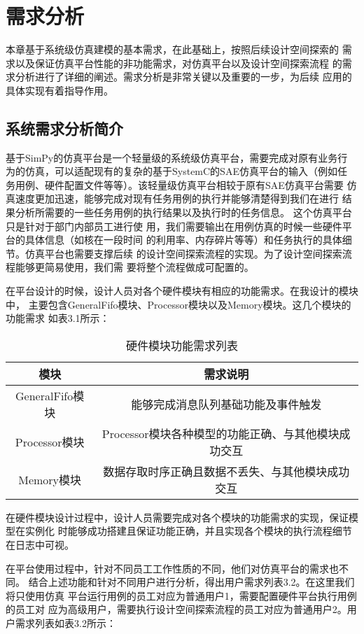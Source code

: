 
\chapter{需求分析}
本章基于系统级仿真建模的基本需求，在此基础上，按照后续设计空间探索的
需求以及保证仿真平台性能的非功能需求，对仿真平台以及设计空间探索流程
的需求分析进行了详细的阐述。需求分析是非常关键以及重要的一步，为后续
应用的具体实现有着指导作用。

\section{系统需求分析简介}
基于SimPy的仿真平台是一个轻量级的系统级仿真平台，需要完成对原有业务行
为的仿真，可以适配现有的复杂的基于SystemC的SAE仿真平台的输入（例如任
务用例、硬件配置文件等等）。该轻量级仿真平台相较于原有SAE仿真平台需要
仿真速度更加迅速，能够完成对现有任务用例的执行并能够清楚得到我们在进行
结果分析所需要的一些任务用例的执行结果以及执行时的任务信息。
这个仿真平台只是针对于部门内部员工进行使
用，我们需要输出在用例仿真的时候一些硬件平台的具体信息（如核在一段时间
的利用率、内存碎片等等）和任务执行的具体细节。仿真平台也需要支撑后续
的设计空间探索流程的实现。为了设计空间探索流程能够更简易使用，我们需
要将整个流程做成可配置的。

在平台设计的时候，设计人员对各个硬件模块有相应的功能需求。在我设计的模块中，
主要包含GeneralFifo模块、Processor模块以及Memory模块。这几个模块的功能需求
如表3.1所示：
\begin{table}[]
    \centering\normalsize
    \caption{硬件模块功能需求列表}
    \begin{tabular}{|c|c|}
    \hline
    模块            & 需求说明                           \\ \hline
    GeneralFifo模块 & 能够完成消息队列基础功能及事件触发              \\ \hline
    Processor模块   & Processor模块各种模型的功能正确、与其他模块成功交互 \\ \hline
    Memory模块      & 数据存取时序正确且数据不丢失、与其他模块成功交互       \\ \hline
    \end{tabular}
    \end{table}

在硬件模块设计过程中，设计人员需要完成对各个模块的功能需求的实现，保证模型在实例化
时能够成功搭建且保证功能正确，并且实现各个模块的执行流程细节在日志中可视。

在平台使用过程中，针对不同员工工作性质的不同，他们对仿真平台的需求也不同。
结合上述功能和针对不同用户进行分析，得出用户需求列表3.2。在这里我们将只使用仿真
平台运行用例的员工对应为普通用户1，需要配置硬件平台执行用例的员工对
应为高级用户，需要执行设计空间探索流程的员工对应为普通用户2。用户需求列表如表3.2所示：

